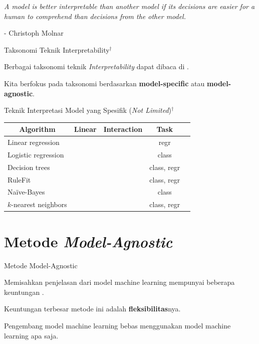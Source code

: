 \documentclass[aspectratio=169]{beamer}
\newcommand{\cmark}{\ding{51}}%
\newcommand{\xmark}{\ding{55}}%
\begin{document}
\begin{frame}
	\centering
	\textit{A model is better interpretable than another model if its decisions are easier for a human to comprehend than decisions from the other model.}
	
	\bigskip
	- Christoph Molnar
\end{frame}

\begin{frame}{Taksonomi Teknik Interpretability$^\dagger$}
    \begin{vfilleditems}
	\item Berbagai taksonomi teknik \textit{Interpretability} dapat dibaca di \citet{molnar2022}. 
	\item Kita berfokus pada taksonomi berdasarkan \textbf{model-specific} atau \textbf{model-agnostic}.
\end{vfilleditems}	
\end{frame}

\begin{frame}{Teknik Interpretasi Model yang Spesifik (\textit{Not Limited})$^\dagger$}
\begin{table}[!ht]
	\centering
	\begin{tabular}{|l|c|c|c|l|}
		\hline
		\multicolumn{1}{|c|}{\textbf{Algorithm}} & \multicolumn{1}{c|}{\textbf{Linear}} & \multicolumn{1}{c|}{\textbf{Interaction}} & \multicolumn{1}{c|}{\textbf{Task}} \\
		\hline
		Linear regression   & \cmark  & \xmark & regr \\
		\hline
		Logistic regression & \xmark  & \xmark      & class \\
		\hline
		Decision trees      & \xmark       & \cmark & class, regr \\
		\hline
		RuleFit & \cmark & \cmark   & class, regr \\
		\hline
		Na\"{i}ve-Bayes     & \xmark  & \xmark & class \\
		\hline
		$k$-nearest neighbors      & \xmark  & \xmark & class, regr \\
		\hline
	\end{tabular}
\end{table}
\end{frame}

\section{Metode \textit{Model-Agnostic}}
\begin{frame}{Metode Model-Agnostic}
	\begin{vfilleditems}
		\item Memisahkan penjelasan dari model machine learning mempunyai beberapa keuntungan \citep{ribeiro2016model}.
		\item Keuntungan terbesar metode ini adalah \textbf{fleksibilitas}nya.
		\item Pengembang model machine learning bebas menggunakan model machine learning apa saja.
	\end{vfilleditems}
\end{frame}
\end{document}
